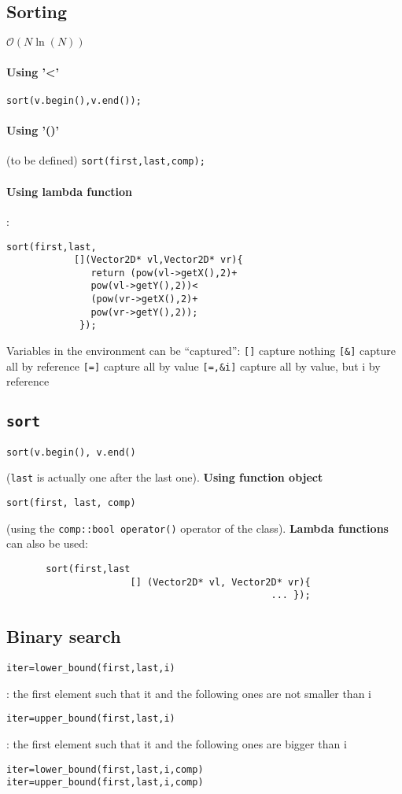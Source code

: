 \documentclass{article}
\newcommand{\code}[1]{\texttt {#1}}
\begin{document}
\subsection{Sorting}
\(\mathcal{O}(N\ln(N))\)
\paragraph{Using '<'}
\code{sort(v.begin(),v.end());}
\paragraph{Using '()'} 
(to be defined)
\code{sort(first,last,comp);}
\paragraph{Using \textbf{lambda function}}:
\begin{lstlisting}
sort(first,last,
            [](Vector2D* vl,Vector2D* vr){
               return (pow(vl->getX(),2)+
               pow(vl->getY(),2))<
               (pow(vr->getX(),2)+
               pow(vr->getY(),2));
             });
\end{lstlisting}
Variables in the environment can be “captured”:
\code{[]} capture nothing
\code{[\&]} capture all by reference
\code{[=]} capture all by value
\code{[=,\&i]} capture all by value, but i by reference

\subsection{\code{sort}}
\begin{lstlisting}
sort(v.begin(), v.end()
\end{lstlisting} (\code{last} is actually one after the last one).
\textbf{Using function object}
\begin{lstlisting}
sort(first, last, comp)
\end{lstlisting} (using the \code{comp::bool operator()} operator of the class).
\textbf{Lambda functions} can also be used:
\begin{lstlisting} 
       sort(first,last
                      [] (Vector2D* vl, Vector2D* vr){
                                               ... });
\end{lstlisting}
                       


\subsection{Binary search}
\begin{lstlisting}
iter=lower_bound(first,last,i)\end{lstlisting} : the first element
such that it and the following ones are \textsf{not smaller} than i
\begin{lstlisting}iter=upper_bound(first,last,i)\end{lstlisting} : the first element
such that it and the following ones are bigger than i 
\begin{lstlisting}
iter=lower_bound(first,last,i,comp)
iter=upper_bound(first,last,i,comp)
\end{lstlisting}
\end{document}

